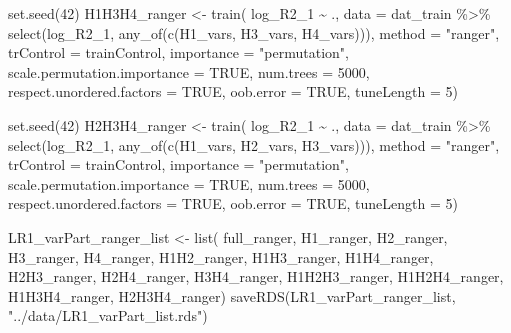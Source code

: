 \documentclass[
  letterpaper,
  DIV=11,
  numbers=noendperiod]{scrreprt}
\newenvironment{Shaded}{\begin{snugshade}}{\end{snugshade}}
\newcommand{\AttributeTok}[1]{\textcolor[rgb]{0.40,0.45,0.13}{#1}}
\newcommand{\ConstantTok}[1]{\textcolor[rgb]{0.56,0.35,0.01}{#1}}
\newcommand{\DecValTok}[1]{\textcolor[rgb]{0.68,0.00,0.00}{#1}}
\newcommand{\FunctionTok}[1]{\textcolor[rgb]{0.28,0.35,0.67}{#1}}
\newcommand{\NormalTok}[1]{\textcolor[rgb]{0.00,0.23,0.31}{#1}}
\newcommand{\OtherTok}[1]{\textcolor[rgb]{0.00,0.23,0.31}{#1}}
\newcommand{\SpecialCharTok}[1]{\textcolor[rgb]{0.37,0.37,0.37}{#1}}
\newcommand{\StringTok}[1]{\textcolor[rgb]{0.13,0.47,0.30}{#1}}
\begin{document}
\begin{Shaded}
\begin{Highlighting}[]
\FunctionTok{set.seed}\NormalTok{(}\DecValTok{42}\NormalTok{)}
\NormalTok{H1H3H4\_ranger }\OtherTok{\textless{}{-}} \FunctionTok{train}\NormalTok{(}
\NormalTok{    log\_R2\_1 }\SpecialCharTok{\textasciitilde{}}\NormalTok{ .,}
    \AttributeTok{data =}\NormalTok{ dat\_train }\SpecialCharTok{\%\textgreater{}\%} \FunctionTok{select}\NormalTok{(log\_R2\_1, }\FunctionTok{any\_of}\NormalTok{(}\FunctionTok{c}\NormalTok{(H1\_vars, H3\_vars, H4\_vars))),}
    \AttributeTok{method =} \StringTok{"ranger"}\NormalTok{,}
    \AttributeTok{trControl =}\NormalTok{ trainControl,}
    \AttributeTok{importance =} \StringTok{"permutation"}\NormalTok{,}
    \AttributeTok{scale.permutation.importance =} \ConstantTok{TRUE}\NormalTok{,}
    \AttributeTok{num.trees =} \DecValTok{5000}\NormalTok{,}
    \AttributeTok{respect.unordered.factors =} \ConstantTok{TRUE}\NormalTok{,}
    \AttributeTok{oob.error =} \ConstantTok{TRUE}\NormalTok{,}
    \AttributeTok{tuneLength =} \DecValTok{5}\NormalTok{)}

\FunctionTok{set.seed}\NormalTok{(}\DecValTok{42}\NormalTok{)}
\NormalTok{H2H3H4\_ranger }\OtherTok{\textless{}{-}} \FunctionTok{train}\NormalTok{(}
\NormalTok{    log\_R2\_1 }\SpecialCharTok{\textasciitilde{}}\NormalTok{ .,}
    \AttributeTok{data =}\NormalTok{ dat\_train }\SpecialCharTok{\%\textgreater{}\%} \FunctionTok{select}\NormalTok{(log\_R2\_1, }\FunctionTok{any\_of}\NormalTok{(}\FunctionTok{c}\NormalTok{(H1\_vars, H2\_vars, H3\_vars))),}
    \AttributeTok{method =} \StringTok{"ranger"}\NormalTok{,}
    \AttributeTok{trControl =}\NormalTok{ trainControl,}
    \AttributeTok{importance =} \StringTok{"permutation"}\NormalTok{,}
    \AttributeTok{scale.permutation.importance =} \ConstantTok{TRUE}\NormalTok{,}
    \AttributeTok{num.trees =} \DecValTok{5000}\NormalTok{,}
    \AttributeTok{respect.unordered.factors =} \ConstantTok{TRUE}\NormalTok{,}
    \AttributeTok{oob.error =} \ConstantTok{TRUE}\NormalTok{,}
    \AttributeTok{tuneLength =} \DecValTok{5}\NormalTok{)}

\NormalTok{LR1\_varPart\_ranger\_list }\OtherTok{\textless{}{-}} \FunctionTok{list}\NormalTok{(}
\NormalTok{    full\_ranger, H1\_ranger, H2\_ranger, H3\_ranger, H4\_ranger, }
\NormalTok{    H1H2\_ranger, H1H3\_ranger, H1H4\_ranger, }
\NormalTok{    H2H3\_ranger, H2H4\_ranger, }
\NormalTok{    H3H4\_ranger, }
\NormalTok{    H1H2H3\_ranger, H1H2H4\_ranger, H1H3H4\_ranger, }
\NormalTok{    H2H3H4\_ranger)}
\FunctionTok{saveRDS}\NormalTok{(LR1\_varPart\_ranger\_list, }\StringTok{"../data/LR1\_varPart\_list.rds"}\NormalTok{)}
\end{Highlighting}
\end{Shaded}
\end{document}
